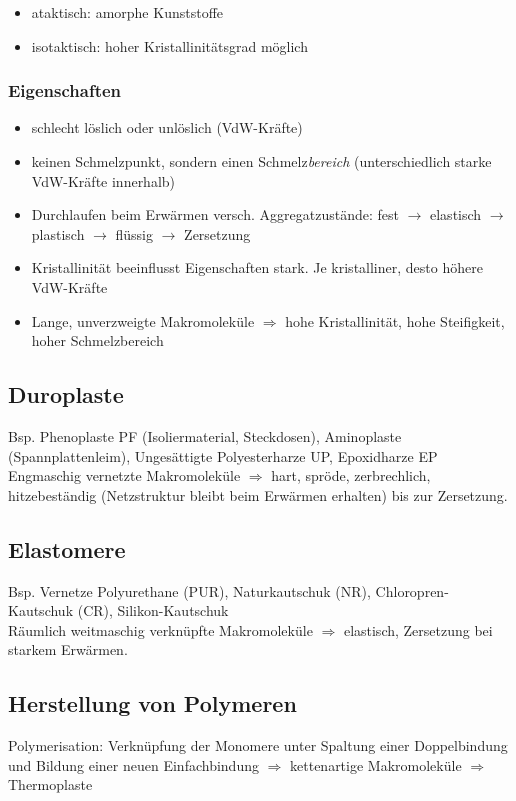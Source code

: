 \begin{itemize}
	\item ataktisch: amorphe Kunststoffe
	\item isotaktisch: hoher Kristallinitätsgrad möglich
\end{itemize}

\subsubsection{Eigenschaften}
\begin{itemize}
	\item schlecht löslich oder unlöslich (VdW-Kräfte)
	\item keinen Schmelzpunkt, sondern einen Schmelz\emph{bereich} (unterschiedlich starke VdW-Kräfte innerhalb)
	\item Durchlaufen beim Erwärmen versch. Aggregatzustände: fest $\rightarrow$ elastisch $\rightarrow$ plastisch $\rightarrow$ flüssig $\rightarrow$ Zersetzung
	\item Kristallinität beeinflusst Eigenschaften stark. Je kristalliner, desto höhere VdW-Kräfte
	\item Lange, unverzweigte Makromoleküle $\Rightarrow$ hohe Kristallinität, hohe Steifigkeit, hoher Schmelzbereich
\end{itemize}


\subsection{Duroplaste}
Bsp. Phenoplaste PF (Isoliermaterial, Steckdosen), Aminoplaste (Spannplattenleim), Ungesättigte Polyesterharze UP, Epoxidharze EP \\

Engmaschig vernetzte Makromoleküle $\Rightarrow$ hart, spröde, zerbrechlich, hitzebeständig (Netzstruktur bleibt beim Erwärmen erhalten) bis zur Zersetzung.

\subsection{Elastomere}
Bsp. Vernetze Polyurethane (PUR), Naturkautschuk (NR), Chloropren-Kautschuk (CR), Silikon-Kautschuk \\

Räumlich weitmaschig verknüpfte Makromoleküle $\Rightarrow$ elastisch, Zersetzung bei starkem Erwärmen.

\subsection{Herstellung von Polymeren}
Polymerisation: Verknüpfung der Monomere unter Spaltung einer Doppelbindung und Bildung einer neuen Einfachbindung $\Rightarrow$ kettenartige Makromoleküle $\Rightarrow$ Thermoplaste \\

